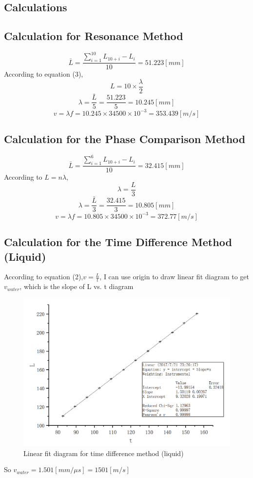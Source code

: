 \documentclass[12pt]{article}
\begin{document}
\subsection{Calculations}
\subsection{Calculation for Resonance Method}
$$\bar{L}=\frac{\sum_{i=1}^{10}L_{10+i}-L_i}{10}=51.223[mm]$$
According to equation (3),$$L=10\times\frac{\lambda}{2}$$
$$\lambda=\frac{\bar{L}}{5}=\frac{51.223}{5}=10.245[mm]$$
$$v=\lambda f=10.245\times34500\times10^{-3}=353.439[m/s]$$
\subsection{Calculation for the Phase Comparison Method}
$$\bar{L}=\frac{\sum_{i=1}^{6}L_{10+i}-L_i}{10}=32.415[mm]$$
According to $L=n\lambda$, $$\lambda=\frac{L}{3}$$
$$\lambda=\frac{\bar{L}}{3}=\frac{32.415}{3}=10.805[mm]$$
$$v=\lambda f=10.805\times34500\times10^{-3}=372.77[m/s]$$
\subsection{Calculation for the Time Difference Method (Liquid)}
According to equation (2),$v=\frac{L}{t}$, I can use origin to draw linear fit diagram to get $v_{water}$, which is the slope of L vs. t diagram
\begin{figure}[H]
\centering
\includegraphics[scale=0.5]{P3.jpg}
\caption{Linear fit diagram for time difference method (liquid)}
\end{figure}
So $v_{water}=1.501[mm/\mu s]=1501[m/s]$
\end{document}
